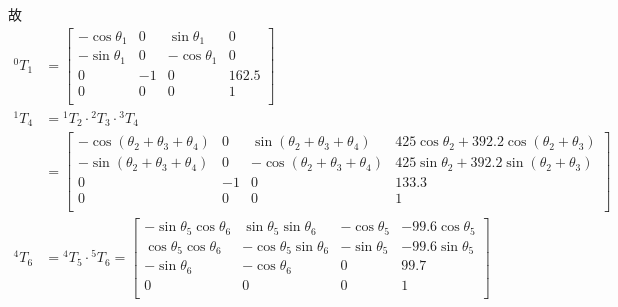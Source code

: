 \documentclass[UTF8, 12pt]{ctexart}
\begin{document}
故
\[
\begin{aligned}
{}^0T_1 &= \begin{bmatrix}
            -\cos\theta_1 & 0 & \sin\theta_1 & 0 \\
            -\sin\theta_1 & 0 & -\cos\theta_1 & 0 \\
            0 & -1 & 0 & 162.5 \\
            0 & 0 & 0 & 1 \\
            \end{bmatrix} \\
{}^1T_4 &= {}^1T_2 \cdot {}^2T_3 \cdot {}^3T_4 \\
        &= \begin{bmatrix}
            -\cos(\theta_2 + \theta_3 + \theta_4) & 0 & \sin(\theta_2 + \theta_3 + \theta_4) & 425\cos\theta_2 + 392.2\cos(\theta_2 + \theta_3) \\
            -\sin(\theta_2 + \theta_3 + \theta_4) & 0 & -\cos(\theta_2 + \theta_3 + \theta_4) & 425\sin\theta_2 + 392.2\sin(\theta_2 + \theta_3) \\
            0 & -1 & 0 & 133.3 \\
            0 & 0 & 0 & 1 \\
            \end{bmatrix} \\
{}^4T_6 &= {}^4T_5 \cdot {}^5T_6 = \begin{bmatrix}
            -\sin\theta_5\cos\theta_6 & \sin\theta_5\sin\theta_6 & -\cos\theta_5 & -99.6\cos\theta_5 \\
            \cos\theta_5\cos\theta_6 & -\cos\theta_5\sin\theta_6 & -\sin\theta_5 & -99.6\sin\theta_5 \\
            -\sin\theta_6 & -\cos\theta_6 & 0 & 99.7 \\
            0 & 0 & 0 & 1 \\
            \end{bmatrix} \\
\end{aligned}
\]
\vspace{5em}
\end{document}
